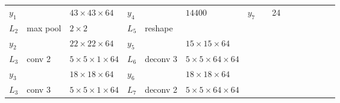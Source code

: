 \begin{landscape}
\begin{table}[h]
{\begin{tabular}{lllllllllllllll}
				\multicolumn{1}{|l|}{$y_1$}   &          & \multicolumn{1}{l|}{$43\times43\times64$}        & \multicolumn{1}{l|}{$y_4$}   &          & \multicolumn{1}{l|}{$14400$}                       & \multicolumn{1}{l|}{$y_7$}   &                & \multicolumn{1}{l|}{24}                    &   &                             &   &                                           &                            &   \\ \cline{1-9}
				\multicolumn{1}{|l|}{$L_2$}   & max pool & \multicolumn{1}{l|}{$2\times 2$}                 & \multicolumn{1}{l|}{$L_5$}   & reshape  & \multicolumn{1}{l|}{}                              &                              &                & \multicolumn{1}{l}{}                       &   &                             &   &                                           &                            &   \\
				\multicolumn{1}{|l|}{$y_2$}   &          & \multicolumn{1}{l|}{$22\times22\times 64$}       & \multicolumn{1}{l|}{$y_5$}   &          & \multicolumn{1}{l|}{$15\times15\times64$}          &                              &                & \multicolumn{1}{l}{}                       &   &                             &   &                                           &                            &   \\ \cline{1-6}
				\multicolumn{1}{|l|}{$L_3$}   & conv 2   & \multicolumn{1}{l|}{$5\times 5\times1\times 64$} & \multicolumn{1}{l|}{$L_6$}   & deconv 3 & \multicolumn{1}{l|}{$5\times 5\times64\times 64$}  &                              &                & \multicolumn{1}{l}{}                       &   &                             &   &                                           &                            &   \\
				\multicolumn{1}{|l|}{$y_3$}   &          & \multicolumn{1}{l|}{$18\times18\times64$}        & \multicolumn{1}{l|}{$y_6$}   &          & \multicolumn{1}{l|}{$18\times18\times64$}          &                              &                & \multicolumn{1}{l}{}                       &   &                             &   &                                           &                            &   \\ \cline{1-6}
				\multicolumn{1}{|l|}{$L_3$}   & conv 3   & \multicolumn{1}{l|}{$5\times 5\times1\times 64$} & \multicolumn{1}{l|}{$L_7$}   & deconv 2 & \multicolumn{1}{l|}{$5\times 5\times64\times 64$}  &                              &                & \multicolumn{1}{l}{}                       &   &                             &   &                                           &                            &   \\

\end{tabular}}
\end{table}
\end{landscape}
